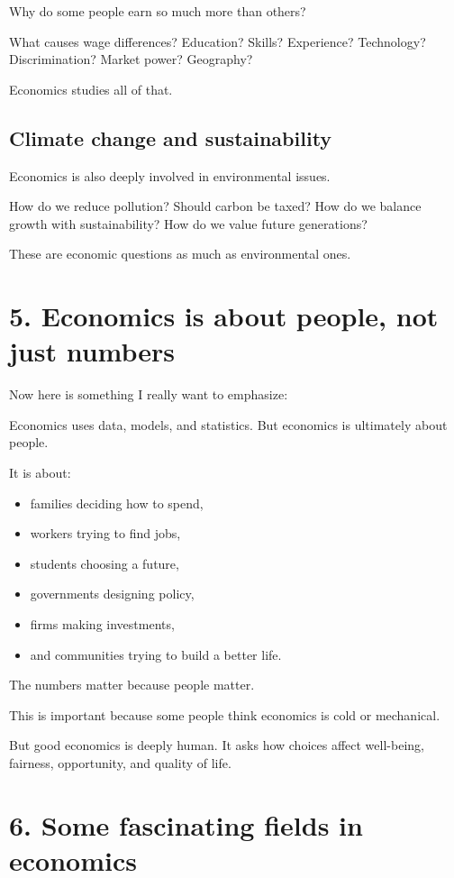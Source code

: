 \documentclass[12pt]{article}
\begin{document}
Why do some people earn so much more than others?

What causes wage differences?  
Education? Skills? Experience? Technology? Discrimination? Market power? Geography?

Economics studies all of that.

\subsection*{Climate change and sustainability}

Economics is also deeply involved in environmental issues.

How do we reduce pollution?  
Should carbon be taxed?  
How do we balance growth with sustainability?  
How do we value future generations?

These are economic questions as much as environmental ones.

\section*{5. Economics is about people, not just numbers}

Now here is something I really want to emphasize:

Economics uses data, models, and statistics.  
But economics is ultimately about people.

It is about:
\begin{itemize}[leftmargin=2em]
    \item families deciding how to spend,
    \item workers trying to find jobs,
    \item students choosing a future,
    \item governments designing policy,
    \item firms making investments,
    \item and communities trying to build a better life.
\end{itemize}

The numbers matter because people matter.

This is important because some people think economics is cold or mechanical.

But good economics is deeply human.  
It asks how choices affect well-being, fairness, opportunity, and quality of life.

\section*{6. Some fascinating fields in economics}
\end{document}
